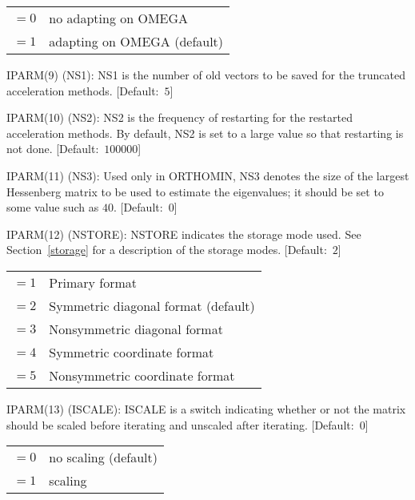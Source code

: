 \begin{list}{}{
               \leftmargin 1.00in \rightmargin 0.25in}
         \begin{tabular}{ll}
          $= 0$ & no adapting on OMEGA \\
          $= 1$ & adapting on OMEGA (default)
         \end{tabular}
 
\item[IPARM(9) \hfill](NS1):
         NS1 is the number of old vectors to be saved for the
         truncated acceleration methods.  \mbox{[Default: $5$]}
 
\item[IPARM(10) \hfill](NS2):
         NS2 is the frequency of restarting for the restarted
         acceleration methods.  By default, NS2 is set to a large
         value so that restarting is not done.  \mbox{[Default: $100000$]}
 
\item[IPARM(11) \hfill](NS3):
         Used only in ORTHOMIN, NS3 denotes the size of the largest 
         Hessenberg matrix to be used to estimate the eigenvalues; 
         it should be set to some value such as $40$.  \mbox{[Default: $0$]}
 
\item[IPARM(12) \hfill](NSTORE):
         NSTORE indicates the storage mode used. See 
         Section~\ref{storage} for a description of the storage 
         modes.  \mbox{[Default: $2$]}
 
         \begin{tabular}{ll}
          $= 1$ & Primary format \\
          $= 2$ & Symmetric diagonal format (default) \\
          $= 3$ & Nonsymmetric diagonal format \\
          $= 4$ & Symmetric coordinate format \\
          $= 5$ & Nonsymmetric coordinate format
         \end{tabular}
 
\item[IPARM(13) \hfill](ISCALE):
         ISCALE is a switch indicating whether or not the matrix
         should be scaled before iterating and unscaled after
         iterating.  \mbox{[Default: $0$]}
 
         \begin{tabular}{ll}
          $= 0$ & no scaling (default) \\
          $= 1$ & scaling
         \end{tabular}
 

\end{list}
